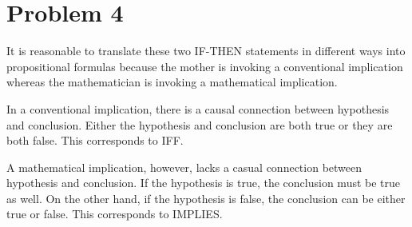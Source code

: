 \documentclass{article}
\begin{document}
\pagebreak

\section{Problem 4}
It is reasonable to translate these two IF-THEN statements in different ways into propositional formulas because the mother is invoking a conventional implication whereas the mathematician is invoking a mathematical implication.

In a conventional implication, there is a causal connection between hypothesis and conclusion. Either the hypothesis and conclusion are both true or they are both false. This corresponds to IFF.

A mathematical implication, however, lacks a casual connection between hypothesis and conclusion. If the hypothesis is true, the conclusion must be true as well.  On the other hand, if the hypothesis is false, the conclusion can be either true or false. This corresponds to IMPLIES.
\end{document}
